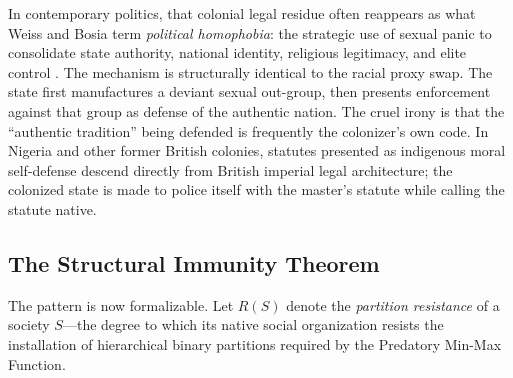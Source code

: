 In contemporary politics, that colonial legal residue often reappears as what Weiss and Bosia term \textit{political homophobia}: the strategic use of sexual panic to consolidate state authority, national identity, religious legitimacy, and elite control \cite{weiss_bosia_global_homophobia}. The mechanism is structurally identical to the racial proxy swap. The state first manufactures a deviant sexual out-group, then presents enforcement against that group as defense of the authentic nation. The cruel irony is that the ``authentic tradition'' being defended is frequently the colonizer's own code. In Nigeria and other former British colonies, statutes presented as indigenous moral self-defense descend directly from British imperial legal architecture; the colonized state is made to police itself with the master's statute while calling the statute native.

\subsection{The Structural Immunity Theorem}

The pattern is now formalizable. Let $R(S)$ denote the \textit{partition resistance} of a society $S$---the degree to which its native social organization resists the installation of hierarchical binary partitions required by the Predatory Min-Max Function.


